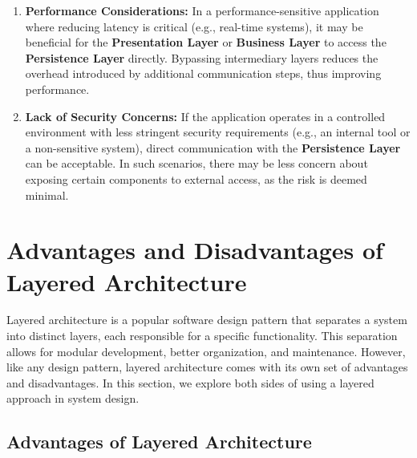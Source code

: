 \begin{enumerate}
	\item \textbf{Performance Considerations:} In a performance-sensitive application where reducing latency is critical (e.g., real-time systems), it may be beneficial for the \textbf{Presentation Layer} or \textbf{Business Layer} to access the \textbf{Persistence Layer} directly. Bypassing intermediary layers reduces the overhead introduced by additional communication steps, thus improving performance.
	\item \textbf{Lack of Security Concerns:} If the application operates in a controlled environment with less stringent security requirements (e.g., an internal tool or a non-sensitive system), direct communication with the \textbf{Persistence Layer} can be acceptable. In such scenarios, there may be less concern about exposing certain components to external access, as the risk is deemed minimal.
\end{enumerate}


\section{Advantages and Disadvantages of Layered Architecture}

Layered architecture is a popular software design pattern that separates a system into distinct layers, each responsible for a specific functionality. This separation allows for modular development, better organization, and maintenance. However, like any design pattern, layered architecture comes with its own set of advantages and disadvantages. In this section, we explore both sides of using a layered approach in system design.

\subsection{Advantages of Layered Architecture}

